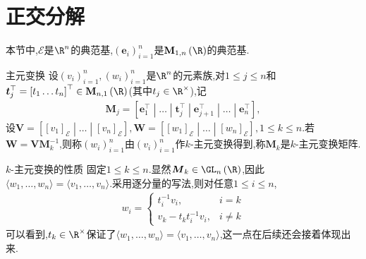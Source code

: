 \section{正交分解}

本节中,$\mathcal{E}$是$\R^{n}$的典范基,$\left(\boldsymbol{e}_{i}\right)_{i=1}^{n}$是$\mathbf{M}_{1,n}\left(\R\right)$的典范基.

\begin{definition}{主元变换}{}
	设$\left(v_{i}\right)_{i=1}^{n},\left(w_{i}\right)_{i=1}^{n}$是$\R^{n}$的元素族,对$1\leq j\leq n$和$\boldsymbol{t}_{j}^{\top}=\left[t_{1}\ldots t_{n}\right]^{\top}\in\mathbf{M}_{n,1}\left(\R\right)$(其中$t_{j}\in\R^{\times}$),记
	\begin{align*}
		\boldsymbol{M}_{j}=\left[\boldsymbol{e}_{1}^{\top}\middle|\ldots\middle|\boldsymbol{t}_{j}^{\top}\middle|\boldsymbol{e}_{j+1}^{\top}\middle|\ldots\middle|\boldsymbol{e}_{n}^{\top}\right],
	\end{align*}
	设$\boldsymbol{V}=\left[\left[v_{1}\right]_{\mathcal{E}}\middle|\ldots\middle|\left[v_{n}\right]_{\mathcal{E}}\right],\boldsymbol{W}=\left[\left[w_{1}\right]_{\mathcal{E}}\middle|\ldots\middle|\left[w_{n}\right]_{\mathcal{E}}\right],1\leq k\le n$.若$\boldsymbol{W}=\boldsymbol{V}\boldsymbol{M}_{k}^{-1}$,则称$\left(w_{i}\right)_{i=1}^{n}$由$\left(v_{i}\right)_{i=1}^{n}$作$k$-主元变换得到,称$\boldsymbol{M}_{k}$是$k$-主元变换矩阵.
\end{definition}

\begin{remark}{$k$-主元变换的性质}{}
	固定$1\leq k\leq n$.显然$\boldsymbol{M}_{k}\in\GL_{n}\left(\R\right)$,因此$\langle w_{1},\ldots,w_{n}\rangle=\langle v_{1},\ldots,v_{n}\rangle$.采用逐分量的写法,则对任意$1\leq i\leq n$,
	\begin{align*}
		w_{i}=
		\begin{cases}
			t_{i}^{-1}v_{i},&i=k\\
			v_{k}-t_{k}t_{i}^{-1}v_{i},&i\neq k
		\end{cases}
	\end{align*}
	可以看到,$t_{k}\in\R^{\times}$保证了$\langle w_{1},\ldots,w_{n}\rangle=\langle v_{1},\ldots,v_{n}\rangle$,这一点在后续还会接着体现出来.
\end{remark}

